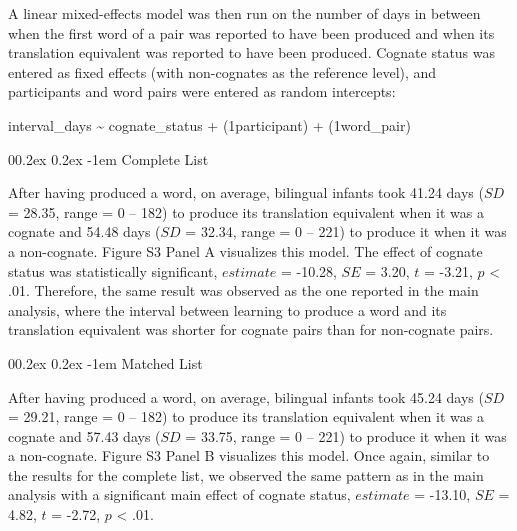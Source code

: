 \documentclass[
  ,man,floatsintext]{apa6}
\makeatletter
\let\oldparagraph\paragraph
\renewcommand{\paragraph}[1]{\oldparagraph{#1}\mbox{}}
\renewcommand{\paragraph}{\@startsection{paragraph}{4}{\parindent}%
  {0\baselineskip \@plus 0.2ex \@minus 0.2ex}%
  {-1em}%
  {\normalfont\normalsize\bfseries\itshape\typesectitle}}
\makeatother
\begin{document}
A linear mixed-effects model was then run on the number of days in between when the first word of a pair was reported to have been produced and when its translation equivalent was reported to have been produced. Cognate status was entered as fixed effects (with non-cognates as the reference level), and participants and word pairs were entered as random intercepts:

interval\_days \textasciitilde{} cognate\_status + (1\textbar participant) + (1\textbar word\_pair)

\hypertarget{complete-list-2}{%
\paragraph{Complete List}\label{complete-list-2}}

After having produced a word, on average, bilingual infants took 41.24 days (\(SD\) = 28.35, range = 0 -- 182) to produce its translation equivalent when it was a cognate and 54.48 days (\(SD\) = 32.34, range = 0 -- 221) to produce it when it was a non-cognate. Figure S3 Panel A visualizes this model. The effect of cognate status was statistically significant, \(estimate\) = -10.28, \(SE\) = 3.20, \(t\) = -3.21, \(p\) \textless{} .01. Therefore, the same result was observed as the one reported in the main analysis, where the interval between learning to produce a word and its translation equivalent was shorter for cognate pairs than for non-cognate pairs.

\hypertarget{matched-list-2}{%
\paragraph{Matched List}\label{matched-list-2}}

After having produced a word, on average, bilingual infants took 45.24 days (\(SD\) = 29.21, range = 0 -- 182) to produce its translation equivalent when it was a cognate and 57.43 days (\(SD\) = 33.75, range = 0 -- 221) to produce it when it was a non-cognate. Figure S3 Panel B visualizes this model. Once again, similar to the results for the complete list, we observed the same pattern as in the main analysis with a significant main effect of cognate status, \(estimate\) = -13.10, \(SE\) = 4.82, \(t\) = -2.72, \(p\) \textless{} .01.
\end{document}
